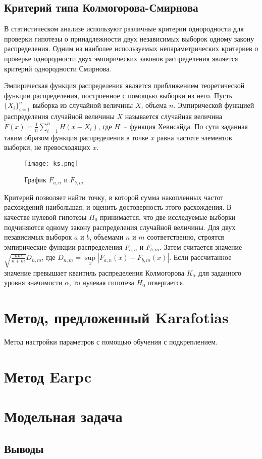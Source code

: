 \subsection{Критерий типа Колмогорова-Смирнова}
\label{ks_criteria}
В статистическом анализе используют различные критерии однородности для проверки гипотезы о принадлежности двух независимых выборок одному закону распределения. Одним из наиболее используемых непараметрических критериев о проверке однородности двух эмпирических законов распределения является критерий однородности Смирнова.

Эмпирическая функция распределения является приближением теоретической функции распределения, построенное с помощью выборки из него. Пусть $\{X_i\}_{i = 1}^n$ выборка из случайной величины $X$, объема $n$. Эмпирической функцией распределения случайной величины $X$ называется случайная величина $F(x) = \frac{1}{n}\sum\limits_{i = 1}^n{H(x - X_i)}$, где $H$~-- функция Хевисайда. По сути заданная таким образом функция распределения в точке $x$ равна частоте элементов выборки, не превосходящих $x$.

\begin{figure}
    \centering
    \texttt{[image: ks.png]}
    \caption{График $F_{a, n}$ и $F_{b, m}$}
    \label{ks}
\end{figure}

Критерий позволяет найти точку, в которой сумма накопленных частот расхождений наибольшая, и оценить достоверность этого расхождения. В качестве нулевой гипотезы $H_0$ принимается, что две исследуемые выборки подчиняются одному закону распределения случайной величины. Для двух независимых выборок $a$ и $b$, объемами $n$ и $m$ соответственно, строятся эмпирические функции распределения $F_{a, n}$ и $F_{b, m}$. Затем считается значение $\sqrt{\frac{nm}{n + m}}D_{n, m}$, где $D_{n, m} = \sup\limits_x|F_{a, n}(x) - F_{b, m}(x)|$. Если рассчитанное значение превышает квантиль распределения Колмогорова $K_{\alpha}$ для заданного уровня значимости $\alpha$, то нулевая гипотеза $H_0$ отвергается.

\section{Метод, предложенный Karafotias}
Метод настройки параметров с помощью обучения с подкреплением.

\section{Метод Earpc}


\section{Модельная задача}

\subsection{Выводы}

